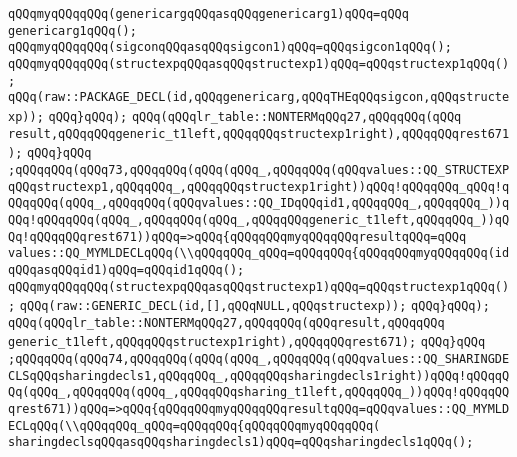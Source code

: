 \verb|qQQqmyqQQqqQQq(genericargqQQqasqQQqgenericarg1)qQQq=qQQq|\newline
\verb|genericarg1qQQq();|\newline
\verb|qQQqmyqQQqqQQq(sigconqQQqasqQQqsigcon1)qQQq=qQQqsigcon1qQQq();|\newline
\verb|qQQqmyqQQqqQQq(structexpqQQqasqQQqstructexp1)qQQq=qQQqstructexp1qQQq();|\newline
\verb|qQQq(raw::PACKAGE_DECL(id,qQQqgenericarg,qQQqTHEqQQqsigcon,qQQqstructexp));|\newline
\verb|qQQq}qQQq);|\newline
\verb|qQQq(qQQqlr_table::NONTERMqQQq27,qQQqqQQq(qQQq|\newline
\verb|result,qQQqqQQqgeneric_t1left,qQQqqQQqstructexp1right),qQQqqQQqrest671);|\newline
\verb|qQQq}qQQq|\newline
\verb|;qQQqqQQq(qQQq73,qQQqqQQq(qQQq(qQQq_,qQQqqQQq(qQQqvalues::QQ_STRUCTEXPqQQqstructexp1,qQQqqQQq_,qQQqqQQqstructexp1right))qQQq!qQQqqQQq_qQQq!qQQqqQQq(qQQq_,qQQqqQQq(qQQqvalues::QQ_IDqQQqid1,qQQqqQQq_,qQQqqQQq_))qQQq!qQQqqQQq(qQQq_,qQQqqQQq(qQQq_,qQQqqQQqgeneric_t1left,qQQqqQQq_))qQQq!qQQqqQQqrest671))qQQq=>qQQq{qQQqqQQqmyqQQqqQQqresultqQQq=qQQq|\newline
\verb|values::QQ_MYMLDECLqQQq(\\qQQqqQQq_qQQq=qQQqqQQq{qQQqqQQqmyqQQqqQQq(idqQQqasqQQqid1)qQQq=qQQqid1qQQq();|\newline
\verb|qQQqmyqQQqqQQq(structexpqQQqasqQQqstructexp1)qQQq=qQQqstructexp1qQQq();|\newline
\verb|qQQq(raw::GENERIC_DECL(id,[],qQQqNULL,qQQqstructexp));|\newline
\verb|qQQq}qQQq);|\newline
\verb|qQQq(qQQqlr_table::NONTERMqQQq27,qQQqqQQq(qQQqresult,qQQqqQQq|\newline
\verb|generic_t1left,qQQqqQQqstructexp1right),qQQqqQQqrest671);|\newline
\verb|qQQq}qQQq|\newline
\verb|;qQQqqQQq(qQQq74,qQQqqQQq(qQQq(qQQq_,qQQqqQQq(qQQqvalues::QQ_SHARINGDECLSqQQqsharingdecls1,qQQqqQQq_,qQQqqQQqsharingdecls1right))qQQq!qQQqqQQq(qQQq_,qQQqqQQq(qQQq_,qQQqqQQqsharing_t1left,qQQqqQQq_))qQQq!qQQqqQQqrest671))qQQq=>qQQq{qQQqqQQqmyqQQqqQQqresultqQQq=qQQqvalues::QQ_MYMLDECLqQQq(\\qQQqqQQq_qQQq=qQQqqQQq{qQQqqQQqmyqQQqqQQq(|\newline
\verb|sharingdeclsqQQqasqQQqsharingdecls1)qQQq=qQQqsharingdecls1qQQq();|\newline
